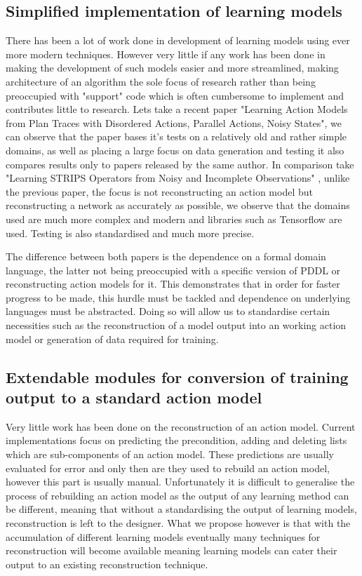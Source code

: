 \subsection{Simplified implementation of learning models}
There has been a lot of work done in development of learning models using ever more modern techniques. However very little if any work has been done in making the development of such models easier and more streamlined, making architecture of an algorithm the sole focus of research rather than being preoccupied with "support" code which is often cumbersome to implement and contributes little to research. Lets take a recent paper "Learning Action Models from Plan Traces with Disordered Actions, Parallel Actions, Noisy States"\cite{AAAIPres94:online}, we can observe that the paper bases it's tests on a relatively old and rather simple domains, as well as placing a large focus on data generation and testing it also compares results only to papers released by the same author. In comparison take "Learning STRIPS Operators from Noisy and Incomplete Observations" \cite{1210488932:online}, unlike the previous paper, the focus is not reconstructing an action model but reconstructing a network as accurately as possible, we observe that the domains used are much more complex and modern and libraries such as Tensorflow are used. Testing is also standardised and much more precise.

The difference between both papers is the dependence on a formal domain language, the latter not being preoccupied with a specific version of PDDL or reconstructing action models for it. This demonstrates that in order for faster progress to be made, this hurdle must be tackled and dependence on underlying languages must be abstracted. Doing so will allow us to standardise certain necessities such as the reconstruction of a model output into an working action model or generation of data required for training.

\subsection{Extendable modules for conversion of training output to a standard action model}
Very little work has been done on the reconstruction of an action model. Current implementations focus on predicting the precondition, adding and deleting lists which are sub-components of an action model. These predictions are usually evaluated for error and only then are they used to rebuild an action model, however this part is usually manual. Unfortunately it is difficult to generalise the process of rebuilding an action model as the output of any learning method can be different, meaning that without a standardising the output of learning models, reconstruction is left to the designer. What we propose however is that with the accumulation of different learning models eventually many techniques for reconstruction will become available meaning learning models can cater their output to an existing reconstruction technique.


